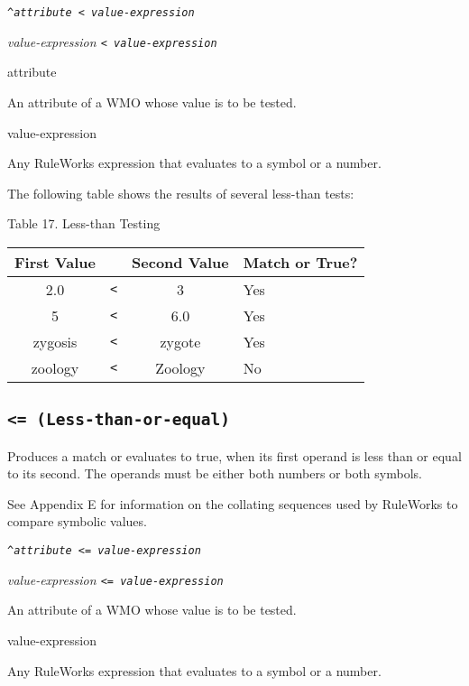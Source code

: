 \Format

\tt{\^}\it{attribute} \tt< \it{value-expression}

\it{value-expression} \tt< \it{value-expression}

\begin{operands}
\item[\ct attribute]

  An attribute of a WMO whose value is to be tested.

\item[value-expression]

  Any RuleWorks expression that evaluates to a symbol or a number.
\end{operands}

\Example

The following table shows the results of several less-than tests:

Table 17. Less-than Testing

\begin{tabularx}{\columnwidth}{cccX}
  \toprule
  First Value &   & Second Value & Match or True? \\
  \midrule
  2.0         & \verb|<| & 3            & Yes \\
  5           & \verb|<| & 6.0          & Yes \\
  zygosis     & \verb|<| & zygote       & Yes \\
  zoology     & \verb|<| & Zoology      & No \\
  \bottomrule
\end{tabularx}

\subsection{\tt{<=} (Less-than-or-equal)}

Produces a match or evaluates to true, when its first operand is less
than or equal to its second. The operands must be either both numbers
or both symbols.

See Appendix E for information on the collating sequences used by
RuleWorks to compare symbolic values.

\Format

\tt{\^}\it{attribute} \tt{<=} \it{value-expression}

\it{value-expression} \tt{<=} \it{value-expression}

\begin{operands}
\item[\ct{attribute}]

  An attribute of a WMO whose value is to be tested.

\item[value-expression]

  Any RuleWorks expression that evaluates to a symbol or a number.
\end{operands}

